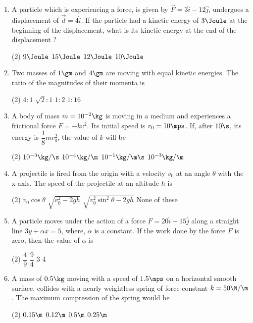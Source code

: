 \documentclass{article}
\begin{document}
\begin{enumerate}
\item A particle which is experiencing a force, is given by $\vec{F}=3\hat{i}-12\hat{j}$, undergoes a displacement of $\vec{d}=4\hat{i}$. If the particle had a kinetic energy of $3\Joule$ at the beginning of the displacement, what is its kinetic energy at the end of the displacement ?
\begin{tasks}(2)
	\task $9\Joule$
	\task $15\Joule$\ans
	\task $12\Joule$
	\task $10\Joule$
\end{tasks}

\item Two masses of $1\gm$ and $4\gm$ are moving with equal kinetic energies. The ratio of the magnitudes of their momenta is
\begin{tasks}(2)
	\task $4:1$
	\task $\sqrt{2}:1$
	\task $1:2$\ans
	\task $1:16$
\end{tasks}

\item A body of mass $m=10^{-2}\kg$ is moving in a medium and experiences a frictional force $F=-kv^2$. Its initial speed is $v_0=10\mps$. If, after $10\s$, its energy is $\dfrac{1}{8}mv_0^2$, the value of $k$ will be
\begin{tasks}(2)
	\task $10^{-3}\kg/\s$
	\task $10^{-4}\kg/\m$\ans
	\task $10^{-1}\kg/\m\s$
	\task $10^{-3}\kg/\m$
\end{tasks}

\item A projectile is fired from the origin with a velocity $v_0$ at an angle $\theta$ with the x-axis. The speed of the projectile at an altitude $h$ is
\begin{tasks}(2)
	\task $v_0\cos\theta$
	\task $\sqrt{v_0^2-2gh}$\ans
	\task $\sqrt{v_0^2\sin^2\theta-2gh}$
	\task None of these
\end{tasks}

\item A particle moves under the action of a force $F = 20\hat{i} + 15 \hat{j}$ along a straight line $3y + \alpha x = 5$, where, $\alpha$ is a constant. If the work done by the force $F$ is zero, then the value of $\alpha$ is
\begin{tasks}(2)
	\task $\dfrac{4}{9}$
	\task $\dfrac{9}{4}$
	\task $3$
	\task $4$\ans
\end{tasks}


\item A mass of $0.5 \kg$ moving with a speed of $1.5 \mps$ on a horizontal smooth surface, collides with a nearly weightless spring of force constant $k = 50 \N/\m$. The maximum compression of the spring would be
\begin{tasks}(2)
	\task $0.15\m$\ans
	\task $0.12\m$
	\task $0.5\m$
	\task $0.25\m$
\end{tasks}




\end{enumerate}
\end{document}

